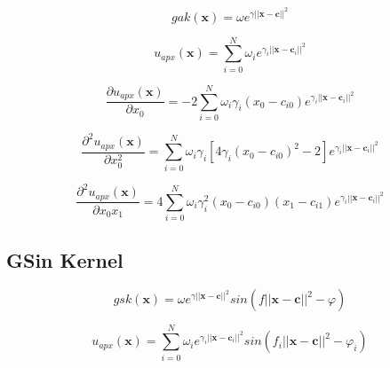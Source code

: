 \documentclass[./\jobname.tex]{subfiles}
\begin{document}
\begin{equation}
\label{eq:gauss_kernel}
gak(\mathbf{x}) = \omega e^{\gamma \left|\left|\mathbf{x} - \mathbf{c} \right|\right|^2}
\end{equation}

\begin{equation}
\label{eq:uapx_gauss_kernel}
u_{apx}(\mathbf{x}) = \sum_{i=0}^{N} \omega_i e^{\gamma_i \left|\left|\mathbf{x} - \mathbf{c}_i \right|\right|^2}
\end{equation}

\begin{equation}
\label{eq:uapx_gauss_kernel_x0}
\frac{\partial u_{apx}(\mathbf{x})}{\partial x_0} = -2 \sum_{i=0}^{N} \omega_i \gamma_i (x_0 - c_{i0}) e^{\gamma_i \left|\left|\mathbf{x} - \mathbf{c}_i \right|\right|^2}
\end{equation}

\begin{equation}
\label{eq:uapx_gauss_kernel_x0x0}
\frac{\partial^2 u_{apx}(\mathbf{x})}{\partial x_0^2} = \sum_{i=0}^{N} \omega_i \gamma_i \left[ 4 \gamma_i (x_0 - c_{i0})^2 - 2 \right] e^{\gamma_i \left|\left|\mathbf{x} - \mathbf{c}_i \right|\right|^2}
\end{equation}

\begin{equation}
\label{eq:uapx_gauss_kernel_x0x1}
\frac{\partial^2 u_{apx}(\mathbf{x})}{\partial x_0 x_1} = 4 \sum_{i=0}^{N} \omega_i \gamma_i^2 (x_0 - c_{i0}) (x_1 - c_{i1}) e^{\gamma_i \left|\left|\mathbf{x} - \mathbf{c}_i \right|\right|^2} 
\end{equation}

\subsection{GSin Kernel}
\label{chap:gsin_kernel}

\begin{equation}
\label{eq:gsin_kernel}
gsk(\mathbf{x}) = \omega e^{\gamma \left|\left|\mathbf{x} - \mathbf{c} \right|\right|^2} sin(f \left|\left|\mathbf{x} - \mathbf{c} \right|\right|^2 - \varphi)
\end{equation}

\begin{equation}
\label{eq:uapx_gsin_kernel}
u_{apx}(\mathbf{x}) = \sum_{i=0}^{N} \omega_i e^{\gamma_i \left|\left|\mathbf{x} - \mathbf{c}_i \right|\right|^2} sin(f_i \left|\left|\mathbf{x} - \mathbf{c} \right|\right|^2 - \varphi_i)
\end{equation}

\begin{equation}
\label{eq:uapx_gsin_kernel_x0}

\end{equation}

\begin{equation}
\label{eq:uapx_gsin_kernel_x0_x0}

\end{equation}

\begin{equation}
\label{eq:uapx_gsin_kernel_x0_x1}

\end{equation}
\end{document}
